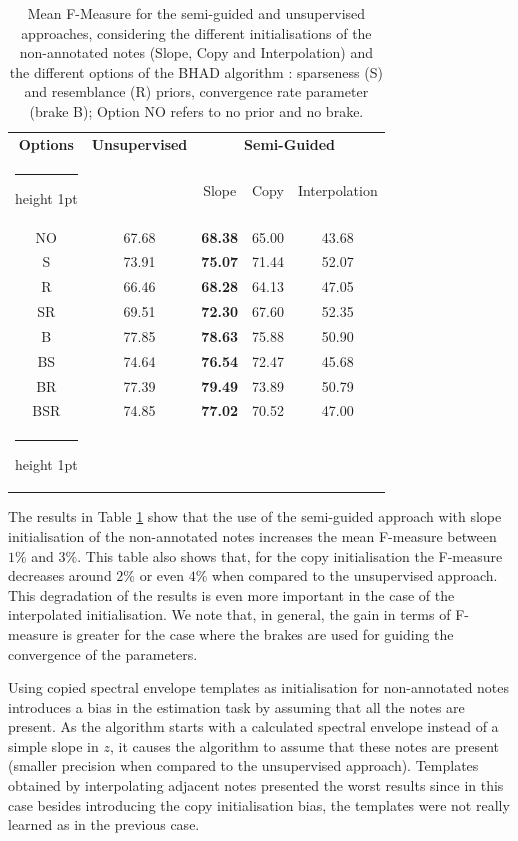\documentclass{article}
\makeatletter
\newcommand{\thickhline}{%
    \noalign {\ifnum 0=`}\fi \hrule height 1pt
    \futurelet \reserved@a \@xhline
}
\makeatother
\begin{document}
\begin{table}[htb]
\begin{tabular}{ccccc}
\hline
\textbf{Options} & \textbf{Unsupervised} & \multicolumn{3}{c}{\textbf{Semi-Guided}} \\\thickhline
 & & Slope & Copy & Interpolation \\\hline
 NO  & 67.68 &	 \textbf{68.38} &	 65.00 &	 43.68 \\
 S   & 73.91 &     \textbf{75.07} &	 71.44 &	 52.07 \\
 R   & 66.46 &	 \textbf{68.28} &	 64.13 &	 47.05 \\
 SR  & 69.51 &	 \textbf{72.30} &	 67.60 &	 52.35 \\ \hline
 B   & 77.85 &	 \textbf{78.63} &	 75.88 &	 50.90 \\
 BS  & 74.64 &	 \textbf{76.54} &	 72.47 &	 45.68 \\
 BR  & 77.39 &	 \textbf{79.49} &	 73.89 &	 50.79 \\
 BSR & 74.85 &	 \textbf{77.02} &	 70.52 & 	 47.00  \\\thickhline
\end{tabular}
\caption{Mean F-Measure for the semi-guided and unsupervised approaches, considering the different initialisations of the non-annotated notes (Slope, Copy and Interpolation) and the different options of the BHAD algorithm : sparseness (S) and resemblance (R) priors, convergence rate parameter (brake B); Option NO refers to no prior and no brake.}
\label{tab:init}
\end{table}


The results in Table \ref{tab:init} show that the use of the semi-guided approach with slope initialisation of the non-annotated notes increases the mean F-measure between $1\%$ and $3\%$. This table also shows that, for the copy initialisation the F-measure decreases around $2\%$ or even $4\%$ when compared to the unsupervised approach. This degradation of the results is even more important in the case of the interpolated initialisation. We note that, in general, the gain in terms of F-measure is greater for the case where the brakes are used for guiding the convergence of the parameters. 

Using copied spectral envelope templates as initialisation for non-annotated notes introduces a bias in the estimation task by assuming that all the notes are present. As the algorithm starts with a calculated spectral envelope instead of a simple slope in $z$, it causes the algorithm to assume that these notes are present (smaller precision when compared to the unsupervised approach). Templates obtained by interpolating adjacent notes presented the worst results since in this case besides introducing the copy initialisation bias, the templates were not really learned as in the previous case.  
\end{document}
